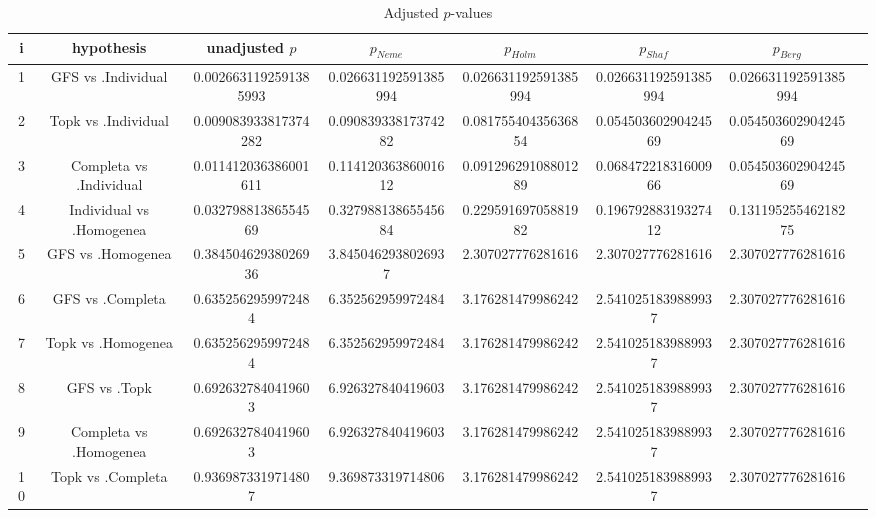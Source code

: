 \documentclass[a4paper,10pt]{article}
\begin{document}
\begin{landscape}
\begin{table}[!htp]
\centering\tiny
\caption{Adjusted $p$-values}
\begin{tabular}{cccccccc}
i&hypothesis&unadjusted $p$&$p_{Neme}$&$p_{Holm}$&$p_{Shaf}$&$p_{Berg}$\\
\hline
1&GFS vs .Individual&0.0026631192591385993&0.026631192591385994&0.026631192591385994&0.026631192591385994&0.026631192591385994\\
2&Topk vs .Individual&0.009083933817374282&0.09083933817374282&0.08175540435636854&0.05450360290424569&0.05450360290424569\\
3&Completa vs .Individual&0.011412036386001611&0.11412036386001612&0.09129629108801289&0.06847221831600966&0.05450360290424569\\
4&Individual vs .Homogenea&0.03279881386554569&0.32798813865545684&0.22959169705881982&0.19679288319327412&0.13119525546218275\\
5&GFS vs .Homogenea&0.38450462938026936&3.8450462938026937&2.307027776281616&2.307027776281616&2.307027776281616\\
6&GFS vs .Completa&0.6352562959972484&6.352562959972484&3.176281479986242&2.5410251839889937&2.307027776281616\\
7&Topk vs .Homogenea&0.6352562959972484&6.352562959972484&3.176281479986242&2.5410251839889937&2.307027776281616\\
8&GFS vs .Topk&0.6926327840419603&6.926327840419603&3.176281479986242&2.5410251839889937&2.307027776281616\\
9&Completa vs .Homogenea&0.6926327840419603&6.926327840419603&3.176281479986242&2.5410251839889937&2.307027776281616\\
10&Topk vs .Completa&0.9369873319714807&9.369873319714806&3.176281479986242&2.5410251839889937&2.307027776281616\\
\hline
\end{tabular}
\end{table}

\end{landscape}
\end{document}
